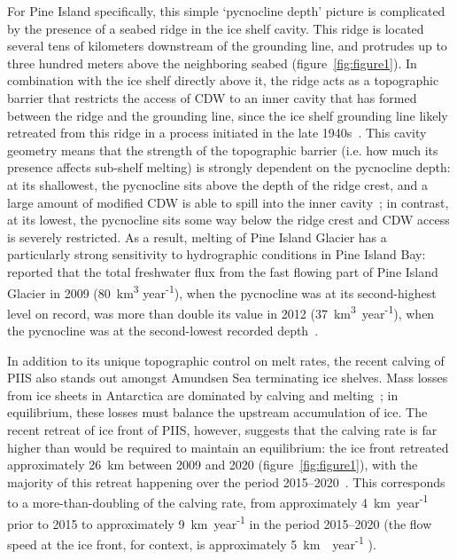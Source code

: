\documentclass[draft]{agujournal2019}
\begin{document}
For Pine Island specifically, this simple `pycnocline depth' picture is complicated by the presence of a seabed ridge in the ice shelf cavity. This ridge is located several tens of kilometers downstream of the grounding line, and protrudes up to three hundred meters above the neighboring seabed (figure~\ref{fig:figure1}). In combination with the ice shelf directly above it, the ridge acts as a topographic barrier that restricts the access of CDW to an inner cavity that has formed between the ridge and the grounding line, since the ice shelf grounding line likely retreated from this ridge in a process initiated in the late 1940s~\cite{Jenkins2010NatureGeo, DeRydt2014JGeophysResOceans, DeRydt2016JGeophysResEarthSurf, Smith2017Nature}. This cavity geometry means that the strength of the topographic barrier (i.e. how much its presence affects sub-shelf melting) is strongly dependent on the pycnocline depth: at its shallowest, the pycnocline sits above the depth of the ridge crest, and a large amount of modified CDW is able to spill into the inner cavity~\cite{Dutrieux2014Science}; in contrast, at its lowest, the pycnocline sits some way below the ridge crest and CDW access is severely restricted.  As a result, melting of Pine Island Glacier has a particularly strong sensitivity to hydrographic conditions in Pine Island Bay:  reported that the total freshwater flux from the fast flowing part of Pine Island Glacier in 2009 (80~km\textsuperscript{3} year\textsuperscript{-1}), when the pycnocline was at its second-highest level on record, was more than double its value in 2012 (37~km\textsuperscript{3}~year\textsuperscript{-1}), when the pycnocline was at the second-lowest recorded depth~\cite{Webber2017NatureComms}.

In addition to its unique topographic control on melt rates, the recent calving of PIIS also stands out amongst Amundsen Sea terminating ice shelves. Mass losses from ice sheets in Antarctica are dominated by calving and melting~\cite{Rignot2013Science}; in equilibrium, these losses must balance the upstream accumulation of ice. The recent retreat of ice front of PIIS, however, suggests that the calving rate is far higher than would be required to maintain an equilibrium: the ice front retreated approximately 26 km between 2009 and 2020 (figure~\ref{fig:figure1}), with the majority of this retreat happening over the period 2015--2020~\cite{Lhermitte2020PNAS, Joughin2021ScienceAdv}. This corresponds to a more-than-doubling of the calving rate, from approximately 4~km~year\textsuperscript{-1} prior to 2015 to approximately 9~km~year\textsuperscript{-1} in the period 2015--2020 (the flow speed at the ice front, for context, is approximately 5~km~~year\textsuperscript{-1} \cite{Joughin2021ScienceAdv}).
\end{document}
